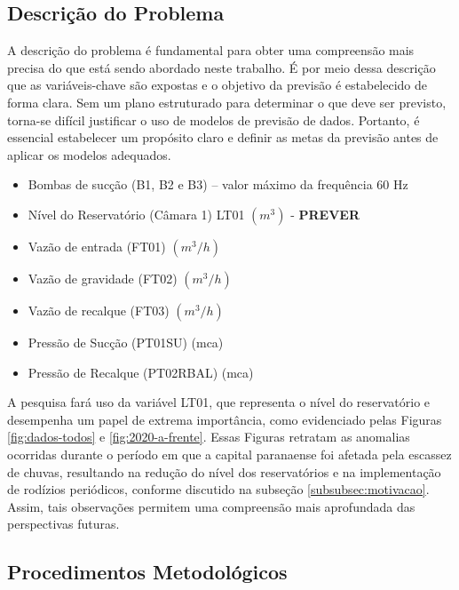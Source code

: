 \subsection{Descri\c c\~ao do Problema} \label{subsec:descricao}

A descrição do problema é fundamental para obter uma compreensão mais precisa do que está sendo abordado neste trabalho. É por meio dessa descrição que as variáveis-chave são expostas e o objetivo da previsão é estabelecido de forma clara. Sem um plano estruturado para determinar o que deve ser previsto, torna-se difícil justificar o uso de modelos de previsão de dados. Portanto, é essencial estabelecer um propósito claro e definir as metas da previsão antes de aplicar os modelos adequados.

\begin{itemize}
	\item Bombas de sucção (B1, B2 e B3) – valor máximo da frequência $60$ Hz
	
	\item Nível do Reservatório (Câmara 1) LT01 $ (m^3) $ - \textbf{PREVER}
	
	\item Vazão de entrada (FT01) $ (m^3/h) $
	
	\item Vazão de gravidade (FT02) $ (m^3/h) $
	
	\item Vazão de recalque (FT03) $ (m^3/h) $
	
	\item Pressão de Sucção (PT01SU) (mca)
	
	\item Pressão de Recalque (PT02RBAL) (mca)
\end{itemize}

A pesquisa fará uso da variável LT01, que representa o nível do reservatório e desempenha um papel de extrema importância, como evidenciado pelas Figuras \ref{fig:dados-todos} e \ref{fig:2020-a-frente}. Essas Figuras retratam as anomalias ocorridas durante o período em que a capital paranaense foi afetada pela escassez de chuvas, resultando na redução do nível dos reservatórios e na implementação de rodízios periódicos, conforme discutido na subseção \ref{subsubsec:motivacao}. Assim, tais observações permitem uma compreensão mais aprofundada das perspectivas futuras.

\subsection{Procedimentos Metodol{\'o}gicos} \label{subsec:metod}

